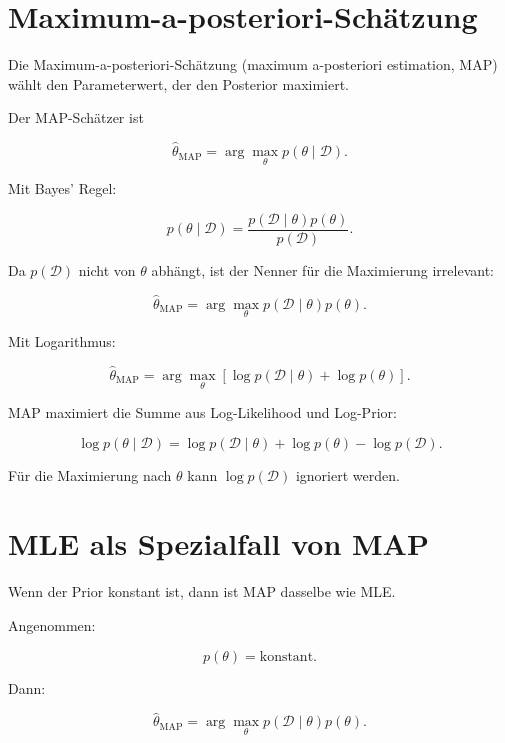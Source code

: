 \section{Maximum-a-posteriori-Schätzung}

Die Maximum-a-posteriori-Schätzung (maximum a-posteriori estimation, MAP) wählt den Parameterwert, der den Posterior maximiert.

\begin{definitionbox}
Der MAP-Schätzer ist

\[
    \hat{\theta}_{\mathrm{MAP}}
    =
    \arg\max_{\theta}
    p(\theta \mid \mathcal{D}).
\]
\end{definitionbox}

Mit Bayes' Regel:

\[
    p(\theta \mid \mathcal{D})
    =
    \frac{
        p(\mathcal{D} \mid \theta)p(\theta)
    }{
        p(\mathcal{D})
    }.
\]

Da \(p(\mathcal{D})\) nicht von \(\theta\) abhängt, ist der Nenner für die Maximierung irrelevant:

\[
    \hat{\theta}_{\mathrm{MAP}}
    =
    \arg\max_{\theta}
    p(\mathcal{D} \mid \theta)p(\theta).
\]

Mit Logarithmus:

\[
    \hat{\theta}_{\mathrm{MAP}}
    =
    \arg\max_{\theta}
    \left[
        \log p(\mathcal{D} \mid \theta)
        +
        \log p(\theta)
    \right].
\]

\begin{conceptbox}
MAP maximiert die Summe aus Log-Likelihood und Log-Prior:

\[
    \log p(\theta \mid \mathcal{D})
    =
    \log p(\mathcal{D} \mid \theta)
    +
    \log p(\theta)
    -
    \log p(\mathcal{D}).
\]

Für die Maximierung nach \(\theta\) kann \(\log p(\mathcal{D})\) ignoriert werden.
\end{conceptbox}

\section{MLE als Spezialfall von MAP}

Wenn der Prior konstant ist, dann ist MAP dasselbe wie MLE.

Angenommen:

\[
    p(\theta) = \text{konstant}.
\]

Dann:

\[
    \hat{\theta}_{\mathrm{MAP}}
    =
    \arg\max_{\theta}
    p(\mathcal{D} \mid \theta)p(\theta).
\]

